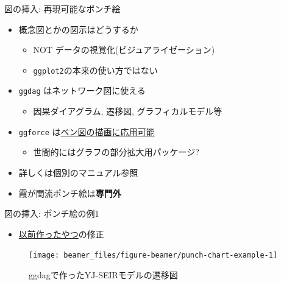 \documentclass[
  12pt,
  ignorenonframetext,
]{beamer}
\providecommand{\tightlist}{%
  \setlength{\itemsep}{0pt}\setlength{\parskip}{0pt}}
\begin{document}
\begin{frame}[fragile]{図の挿入: 再現可能なポンチ絵}
\protect\hypertarget{ux56f3ux306eux633fux5165-ux518dux73feux53efux80fdux306aux30ddux30f3ux30c1ux7d75}{}

\begin{itemize}
\tightlist
\item
  概念図とかの図示はどうするか

  \begin{itemize}
  \tightlist
  \item
    NOT データの視覚化(ビジュアライゼーション)
  \item
    \texttt{ggplot2}の本来の使い方ではない
  \end{itemize}
\item
  \texttt{ggdag} はネットワーク図に使える

  \begin{itemize}
  \tightlist
  \item
    因果ダイアグラム, 遷移図, グラフィカルモデル等
  \end{itemize}
\item
  \texttt{ggforce}
  は\href{https://rpubs.com/sdutky/559050}{ベン図の描画に応用可能}

  \begin{itemize}
  \tightlist
  \item
    世間的にはグラフの部分拡大用パッケージ?
  \end{itemize}
\item
  詳しくは個別のマニュアル参照
\item
  霞が関流ポンチ絵は\textbf{専門外}
\end{itemize}

\end{frame}

\begin{frame}{図の挿入: ポンチ絵の例1}
\protect\hypertarget{ux56f3ux306eux633fux5165-ux30ddux30f3ux30c1ux7d75ux306eux4f8b1}{}

\begin{itemize}
\tightlist
\item
  \href{https://speakerdeck.com/ktgrstsh/r-and-epidemical-mathematical-models}{以前作ったやつ}の修正
\end{itemize}

\begin{figure}

{\centering \texttt{[image: beamer\_files/figure-beamer/punch-chart-example-1]} 

}

\caption{ggdagで作ったYJ-SEIRモデルの遷移図}\label{fig:punch-chart-example}
\end{figure}

\end{frame}
\end{document}
